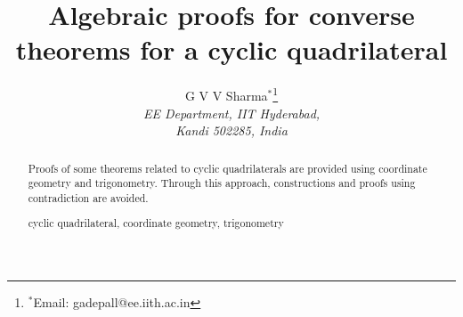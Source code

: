 \documentclass[]{tMES2e}
\begin{document}


\articletype{}

\title{Algebraic proofs for converse theorems for  a cyclic quadrilateral}
\author{G V V Sharma$^{\ast}$\thanks{ $^{\ast}$Email: gadepall@ee.iith.ac.in
\vspace{6pt}} \\\vspace{6pt}  {\em{EE Department, IIT Hyderabad,\\ Kandi 502285, India}}}




\maketitle

\begin{abstract}
Proofs of some theorems related to cyclic quadrilaterals are provided using coordinate geometry and trigonometry.  Through this approach, constructions and proofs using contradiction are avoided. 
\begin{keywords}
cyclic quadrilateral, coordinate geometry, trigonometry
\end{keywords}\bigskip


\end{abstract}
\end{document}
